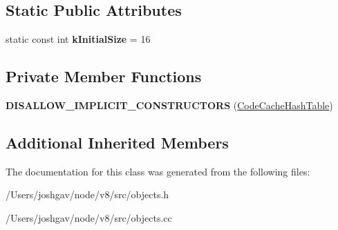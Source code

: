 \subsection*{Static Public Attributes}
\begin{DoxyCompactItemize}
\item 
static const int {\bfseries k\+Initial\+Size} = 16\hypertarget{classv8_1_1internal_1_1_code_cache_hash_table_a5b69b933f2a8fb5726b8bd88e309dadf}{}\label{classv8_1_1internal_1_1_code_cache_hash_table_a5b69b933f2a8fb5726b8bd88e309dadf}

\end{DoxyCompactItemize}
\subsection*{Private Member Functions}
\begin{DoxyCompactItemize}
\item 
{\bfseries D\+I\+S\+A\+L\+L\+O\+W\+\_\+\+I\+M\+P\+L\+I\+C\+I\+T\+\_\+\+C\+O\+N\+S\+T\+R\+U\+C\+T\+O\+RS} (\hyperlink{classv8_1_1internal_1_1_code_cache_hash_table}{Code\+Cache\+Hash\+Table})\hypertarget{classv8_1_1internal_1_1_code_cache_hash_table_ab529db73a089d7b27dbd3fbf11a7f476}{}\label{classv8_1_1internal_1_1_code_cache_hash_table_ab529db73a089d7b27dbd3fbf11a7f476}

\end{DoxyCompactItemize}
\subsection*{Additional Inherited Members}


The documentation for this class was generated from the following files\+:\begin{DoxyCompactItemize}
\item 
/\+Users/joshgav/node/v8/src/objects.\+h\item 
/\+Users/joshgav/node/v8/src/objects.\+cc\end{DoxyCompactItemize}

